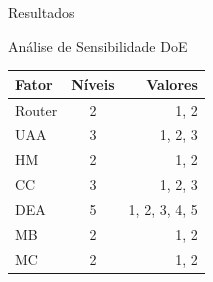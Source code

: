 \documentclass{beamer}
\begin{document}
    \begin{frame}{Resultados}
    
        Análise de Sensibilidade DoE
        
        \begin{table}[h]
        \centering
        \begin{tabular}{lcr}
        \hline
        Fator  & Níveis & Valores       \\ \hline
        Router & 2      & 1, 2          \\
        UAA    & 3      & 1, 2, 3       \\
        HM     & 2      & 1, 2          \\
        CC     & 3      & 1, 2, 3       \\
        DEA    & 5      & 1, 2, 3, 4, 5 \\
        MB     & 2      & 1, 2          \\
        MC     & 2      & 1, 2          \\ \hline
        \end{tabular}
        \end{table}

    \end{frame}
\end{document}
